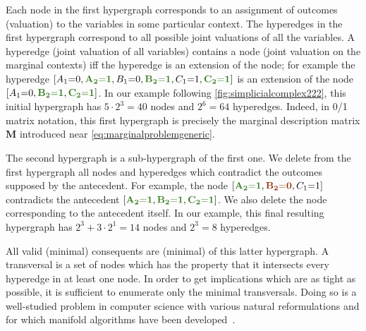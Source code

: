 {%
  Each node in the first hypergraph corresponds to an assignment of outcomes (valuation) to the variables in some particular context. 
The hyperedges in the first hypergraph correspond to all possible joint valuations of all the variables. A hyperedge (joint valuation of all variables) contains a node (joint valuation on the marginal contexts) iff the hyperedge is an extension of the node; for example the hyperedge $\bracks{A_1 \eql 0, \mgreen{A_2 \eql 1}, B_1 \eql 0, \mgreen{B_2 \eql 1}, C_1 \eql 1, \mgreen{C_2 \eql 1}}$ is an extension of the node $\bracks{A_1 \eql 0,  \mgreen{B_2 \eql 1}, \mgreen{C_2 \eql 1}}$. In our example following \cref{fig:simplicialcomplex222}, this initial hypergraph has $5\cdot 2^3 = 40$ nodes and $2^6 = 64$ hyperedges. Indeed, in 0/1 matrix notation, this first hypergraph is precisely the marginal description matrix $\bm{M}$ introduced near \cref{eq:marginalproblemgeneric}.

The second hypergraph is a sub-hypergraph of the first one. We delete from the first hypergraph all nodes and hyperedges which contradict the outcomes supposed by the antecedent. For example, the node $\bracks{\mgreen{A_2 \eql 1}, \mred{B_2 \eql 0}, C_1 \eql 1}$ contradicts the antecedent $\bracks{\mgreen{A_2 \eql 1}, \mgreen{B_2 \eql 1}, \mgreen{C_2 \eql 1}}$. We also delete the node corresponding to the antecedent itself. In our example, this final resulting hypergraph has $2^3 + 3\cdot 2^1 = 14$ nodes and $2^3 = 8$ hyperedges.

All valid (minimal) consequents are (minimal)  of this latter hypergraph. A transversal is a set of nodes which has the property that it intersects every hyperedge in at least one node. In order to get implications which are as tight as possible, it is sufficient to enumerate only the minimal transversals. Doing so is a well-studied problem in computer science with various natural reformulations and for which manifold algorithms have been developed~\cite{eiter_dualization_2008}.


}
